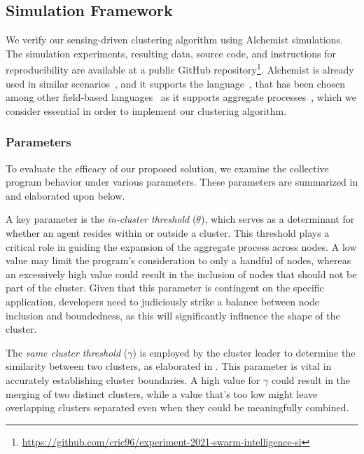 \subsection{Simulation Framework}\label{s:eval:sim-framework}

We verify our sensing-driven clustering algorithm using Alchemist simulations.
The simulation experiments, resulting data, source code, and instructions for reproducibility are available at a public GitHub repository\footnote{\url{https://github.com/cric96/experiment-2021-swarm-intelligence-si}}.
%
Alchemist is already used in similar scenarios~\cite{DBLP:journals/eaai/CasadeiVAPD21}, and it supports the \scafi{} language~\cite{DBLP:conf/isola/CasadeiVAD20},
 that has been chosen among other field-based languages~\cite{DBLP:journals/jlap/ViroliBDACP19} as it supports aggregate processes~\cite{DBLP:conf/coordination/CasadeiVAPD19},
 which we consider essential in order to implement our clustering algorithm.

\subsubsection{Parameters}

To evaluate the efficacy of our proposed solution, we examine the collective program behavior under various parameters. 
 These parameters are summarized in  and elaborated upon below.

A key parameter is the \emph{in-cluster threshold} ($\theta$), 
 which serves as a determinant for whether an agent resides within or outside a cluster. 
 This threshold plays a critical role in guiding the expansion of the aggregate process across nodes. 
 A low value may limit the program's consideration to only a handful of nodes, 
 whereas an excessively high value could result in the inclusion of nodes that should not be part of the cluster. 
 Given that this parameter is contingent on the specific application, 
 developers need to judiciously strike a balance between node inclusion and boundedness, 
 as this will significantly influence the shape of the cluster.

The \emph{same cluster threshold} ($\gamma$) is employed by the cluster leader to determine the similarity between two clusters, 
 as elaborated in .
%
This parameter is vital in accurately establishing cluster boundaries. 
 A high value for $\gamma$ could result in the merging of two distinct clusters, 
 while a value that's too low might leave overlapping clusters separated even when they could be meaningfully combined.

